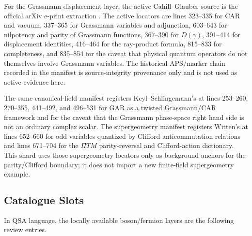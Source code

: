 For the Grassmann displacement layer, the active Cahill--Glauber source is the
official arXiv e-print extraction
.
The active locators are lines 323--335 for CAR and vacuum, 337--365 for
Grassmann variables and adjunction, 603--643 for nilpotency and parity of
Grassmann functions, 367--390 for \(D(\gamma)\), 391--414 for displacement
identities, 416--464 for the ray-product formula, 815--833 for completeness,
and 835--854 for the caveat that physical quantum operators do not themselves
involve Grassmann variables.  The historical APS/marker chain recorded in the
manifest is source-integrity provenance only and is not used as active
evidence here.

The same canonical-field manifest registers Keyl--Schlingemann's
at lines 253--260, 270--355, 441--492, and 496--531 for GAR as a twisted
Grassmann/CAR framework and for the caveat that the Grassmann phase-space
right hand side is not an ordinary complex scalar.  The supergeometry manifest
 registers Witten's
 at
lines 652--660 for odd variables quantized by Clifford anticommutation
relations and lines 671--704 for the \(\Pi TM\) parity-reversal and
Clifford-action dictionary.  This shard uses those supergeometry locators only
as background anchors for the parity/Clifford boundary; it does not import a
new finite-field supergeometry example.

\subsection{Catalogue Slots}

In QSA language, the locally available boson/fermion layers are the following
review entries.

